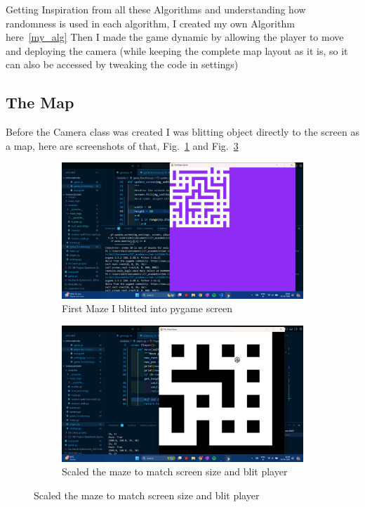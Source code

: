 \documentclass{article}
\begin{document}
Getting Inspiration from all these Algorithms and understanding how randomness is used in each algorithm, I created my own Algorithm here~\ref{my_alg}
Then I made the game dynamic by allowing the player to move and deploying the camera (while keeping the complete map layout as it is, so it can also be accessed by tweaking the code in settings)
\subsection{The Map}
Before the Camera class was created I was blitting object directly to the screen as a map, here are screenshots of that, Fig.~\ref{fig:map1} and Fig.~\ref{fig:map2}
\begin{figure}[h]
    \caption[1]{}
    \begin{subfigure}[b]{0.5\textwidth}
        \centering
        \includegraphics[width=\textwidth]{screenshots/Screenshot (168).png}
        \caption[(a)]{First Maze I blitted into pygame screen}
        \label{fig:map1}
    \end{subfigure}
    \begin{subfigure}[b]{0.5\textwidth}
        \centering
        \includegraphics[width=\textwidth]{screenshots/Screenshot (169).png}
        \caption[(a)]{Scaled the maze to match screen size and blit player}
        \label{fig:map2}
    \end{subfigure}
\end{figure}
\end{document}
